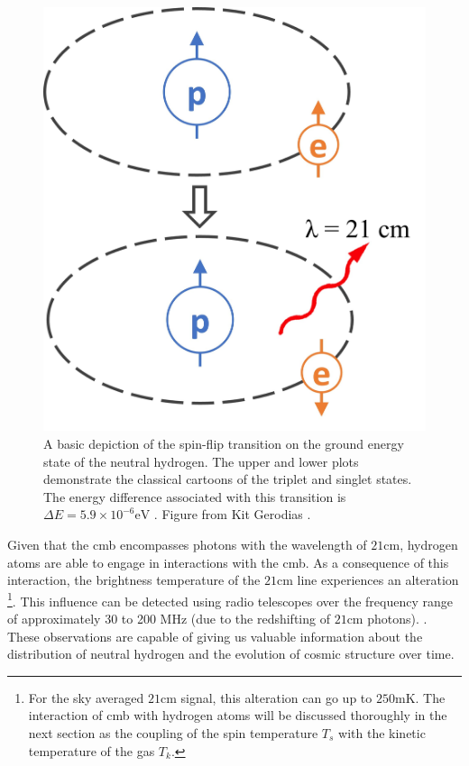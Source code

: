 \documentclass[12pt, TexShade, letterpaper]{report}
\begin{document}
\begin{figure}[h!]
\centering
\includegraphics[scale =0.4]{spinflip.jpg}
\caption[Spin-flip Transition of Neutral Hydrogen]{A basic depiction of the spin-flip transition on the ground energy state of the neutral hydrogen. The upper and lower plots demonstrate the classical cartoons of the triplet and singlet states. The energy difference associated with this transition is $\Delta E = 5.9 \times 10 ^{-6}\mathrm{eV}$ \cite{21century}. Figure from Kit Gerodias \cite{kit_thesis}.}
\label{fig:spinflip}
\end{figure}

Given that the \gls{cmb} encompasses photons with the wavelength of $\mathrm{21cm}$, hydrogen atoms are able to engage in interactions with the \gls{cmb}. As a consequence of this interaction, the brightness temperature of the $\mathrm{21cm}$ line experiences an alteration \footnote{For the sky averaged $\mathrm{21cm}$ signal, this alteration can go up to $\mathrm{250mK}$. The interaction of \gls{cmb} with hydrogen atoms will be discussed thoroughly in the next section as the coupling of the spin temperature $T_s$ with the kinetic temperature of the gas $T_k$.}. This influence can be detected using radio telescopes over the frequency range of approximately 30 to 200 $\mathrm{MHz}$ (due to the redshifting of $\mathrm{21cm}$ photons). \cite{low_frequency}. These observations are capable of giving us valuable information about the distribution of neutral hydrogen and the evolution of cosmic structure over time\cite{low_frequency}.\par
\end{document}
